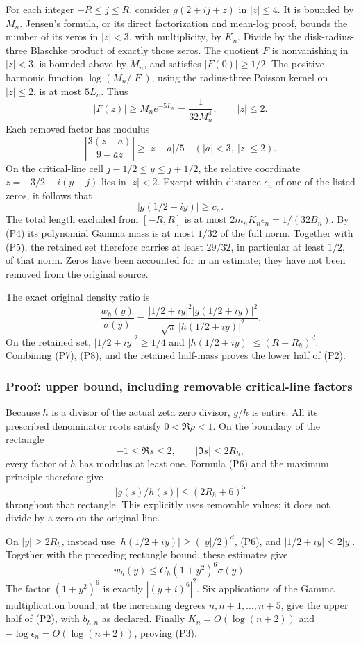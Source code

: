 For each integer \(-R\le j\le R\), consider \(g(2+ij+z)\) in \(|z|\le4\). It is bounded by \(M_n\). Jensen's formula, or its direct factorization and mean-log proof, bounds the number of its zeros in \(|z|<3\), with multiplicity, by \(K_n\). Divide by the disk-radius-three Blaschke product of exactly those zeros. The quotient \(F\) is nonvanishing in \(|z|<3\), is bounded above by \(M_n\), and satisfies \(|F(0)|\ge1/2\). The positive harmonic function \(\log(M_n/|F|)\), using the radius-three Poisson kernel on \(|z|\le2\), is at most \(5L_n\). Thus \[
 |F(z)|\ge M_ne^{-5L_n}=\frac1{32M_n^4},\qquad |z|\le2.
\] Each removed factor has modulus \[
 \left|\frac{3(z-a)}{9-\bar a z}\right|\ge|z-a|/5
 \quad(|a|<3,\ |z|\le2).
\] On the critical-line cell \(j-1/2\le y\le j+1/2\), the relative coordinate \(z=-3/2+i(y-j)\) lies in \(|z|<2\). Except within distance \(\epsilon_n\) of one of the listed zeros, it follows that \[
 |g(1/2+iy)|\ge c_n. \tag{P7}
\] The total length excluded from \([-R,R]\) is at most \(2m_nK_n\epsilon_n=1/(32B_n)\). By (P4) its polynomial Gamma mass is at most \(1/32\) of the full norm. Together with (P5), the retained set therefore carries at least \(29/32\), in particular at least \(1/2\), of that norm. Zeros have been accounted for in an estimate; they have not been removed from the original source.

The exact original density ratio is \[
 \frac{w_h(y)}{\sigma(y)}
 =\frac{|1/2+iy|^2|g(1/2+iy)|^2}
 {\sqrt\pi\,|h(1/2+iy)|^2}. \tag{P8}
\] On the retained set, \(|1/2+iy|^2\ge1/4\) and \(|h(1/2+iy)|\le(R+R_h)^d\). Combining (P7), (P8), and the retained half-mass proves the lower half of (P2).

\subsubsection{Proof: upper bound, including removable critical-line factors}\label{proof-upper-bound-including-removable-critical-line-factors}

Because \(h\) is a divisor of the actual zeta zero divisor, \(g/h\) is entire. All its prescribed denominator roots satisfy \(0<\Re\rho<1\). On the boundary of the rectangle \[
 -1\le\Re s\le2,\qquad |\Im s|\le2R_h,
\] every factor of \(h\) has modulus at least one. Formula (P6) and the maximum principle therefore give \[
 |g(s)/h(s)|\le(2R_h+6)^5
\] throughout that rectangle. This explicitly uses removable values; it does not divide by a zero on the original line.

On \(|y|\ge2R_h\), instead use \(|h(1/2+iy)|\ge(|y|/2)^d\), (P6), and \(|1/2+iy|\le2|y|\). Together with the preceding rectangle bound, these estimates give \[
 w_h(y)\le C_h(1+y^2)^6\sigma(y). \tag{P9}
\] The factor \((1+y^2)^6\) is exactly \(|(y+i)^6|^2\). Six applications of the Gamma multiplication bound, at the increasing degrees \(n,n+1,\ldots,n+5\), give the upper half of (P2), with \(b_{h,n}\) as declared. Finally \(K_n=O(\log(n+2))\) and \(-\log\epsilon_n=O(\log(n+2))\), proving (P3).

